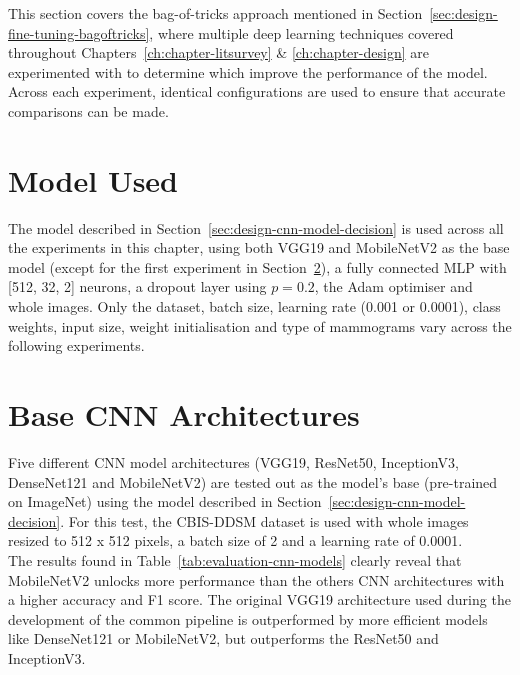 This section covers the bag-of-tricks approach mentioned in Section~\ref{sec:design-fine-tuning-bagoftricks}, where multiple deep learning techniques covered throughout Chapters~\ref{ch:chapter-litsurvey} \& \ref{ch:chapter-design} are experimented with to determine which improve the performance of the model. Across each experiment, identical configurations are used to ensure that accurate comparisons can be made.


\section{Model Used}

The model described in Section~\ref{sec:design-cnn-model-decision} is used across all the experiments in this chapter, using both VGG19 and MobileNetV2 as the base model (except for the first experiment in Section~\ref{sec:evaluation-cnn-model-experiment}), a fully connected MLP with [512, 32, 2] neurons, a dropout layer using $p=0.2$, the Adam optimiser and whole images. Only the dataset, batch size, learning rate (0.001 or 0.0001), class weights, input size, weight initialisation and type of mammograms vary across the following experiments.


\section{Base CNN Architectures}
\label{sec:evaluation-cnn-model-experiment}

Five different CNN model architectures (VGG19, ResNet50, InceptionV3, DenseNet121 and MobileNetV2) are tested out as the model's base (pre-trained on ImageNet) using the model described in Section~\ref{sec:design-cnn-model-decision}. For this test, the CBIS-DDSM dataset is used with whole images resized to 512 x 512 pixels, a batch size of 2 and a learning rate of 0.0001.\\

The results found in Table~\ref{tab:evaluation-cnn-models} clearly reveal that MobileNetV2 unlocks more performance than the others CNN architectures with a higher accuracy and F1 score. The original VGG19 architecture used during the development of the common pipeline is outperformed by more efficient models like DenseNet121 or MobileNetV2, but outperforms the ResNet50 and InceptionV3.

